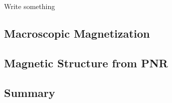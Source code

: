 \documentclass[\main/dresen_thesis.tex]{subfiles}
\renewcommand{\thisPath}{\main/chapters/doublelayers/magnetism}
\begin{document}
  Write something

  \subsection{Macroscopic Magnetization}
  
    \FloatBarrier

  \subsection{Magnetic Structure from PNR}
  
    \FloatBarrier

  \subsection{Summary}
  
    \FloatBarrier
\end{document}
